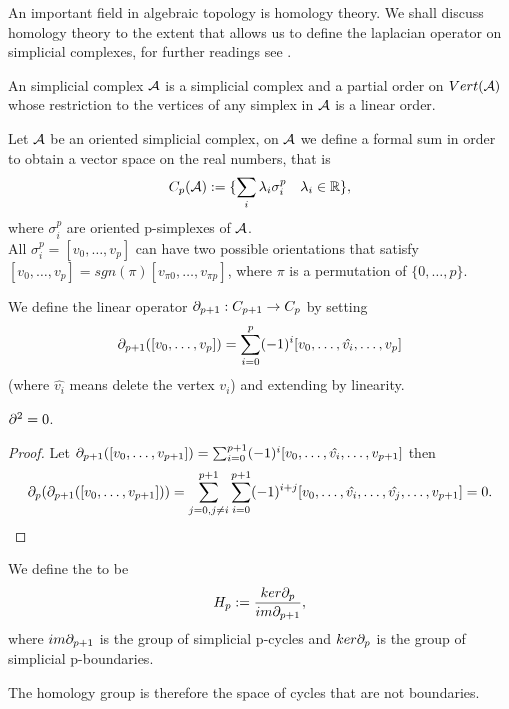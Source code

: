 \documentclass[../1.tex]{subfiles}
\begin{document}
    An important field in algebraic topology is homology theory. We shall discuss homology theory to the extent
    that allows us to define the laplacian operator on simplicial complexes, for further readings see \cite{hatcher}.
    \begin{defn}
        An  simplicial complex $\mathcal{A}$ is a simplicial complex and a partial order on $Vert(\mathcal{A})$ whose
        restriction to the vertices of any simplex in $\mathcal{A}$ is a linear order.
    \end{defn}

    \begin{defn}
        Let $\mathcal{A}$ be an oriented simplicial complex, on $\mathcal{A}$ we define a formal sum in order
        to obtain a vector space on the real numbers, that is
        \[ C_p(\mathcal{A}) := \{ \sum_i \lambda_i \sigma_i^p \quad \lambda_i \in \mathbb{R} \},\]
        where $\sigma_i^p$ are oriented p-simplexes of $\mathcal{A}$.\\
        All $\sigma_i^p = [v_0,\dots,v_p]$ can have two possible orientations that satisfy
        $ [v_0,\dots,v_p] = sgn (\pi)[v_{\pi 0},\dots,v_{\pi p}]$,
        where $\pi$ is a permutation of $\{0,\dots,p\}$.        
    \end{defn}

    \begin{defn}
        We define the linear operator $\partial_{p+1} : C_{p+1} \to C_p$ by setting
        \[ \partial_{p+1}([v_0,\dots,v_p]) = \sum_{i=0}^p (-1)^i[v_0,\dots,\hat{v_i},\dots,v_p] \]
        (where $\hat{v_i}$ means delete the vertex $v_i$) and extending by linearity.
    \end{defn}


    \begin{thm}
        $\partial^2 = 0$.
    \end{thm}
    \begin{proof}
        Let $\partial_{p+1}([v_0,\dots,v_{p+1}]) = \sum_{i=0}^{p+1} (-1)^i[v_0,\dots,\hat{v_i},\dots,v_{p+1}]$ then 
        \[\partial_p(\partial_{p+1}([v_0,\dots,v_{p+1}])) =\sum_{j=0, j \neq i}^{p+1} \sum_{i=0}^{p+1} (-1)^{i+j}[v_0,\dots,\hat{v_i},\dots,\hat{v_j},\dots,v_{p+1}] = 0.\]        
    \end{proof}

    \begin{defn}
        We define the  to be 
        \[H_p := \frac{ker\partial_p}{im\partial_{p+1}},\] 
        where $im\partial_{p+1}$ is the group of simplicial p-cycles and
        $ker\partial_p$ is the group of simplicial p-boundaries.
    \end{defn}

    The homology group is therefore the space of cycles that are not boundaries.
\end{document}
